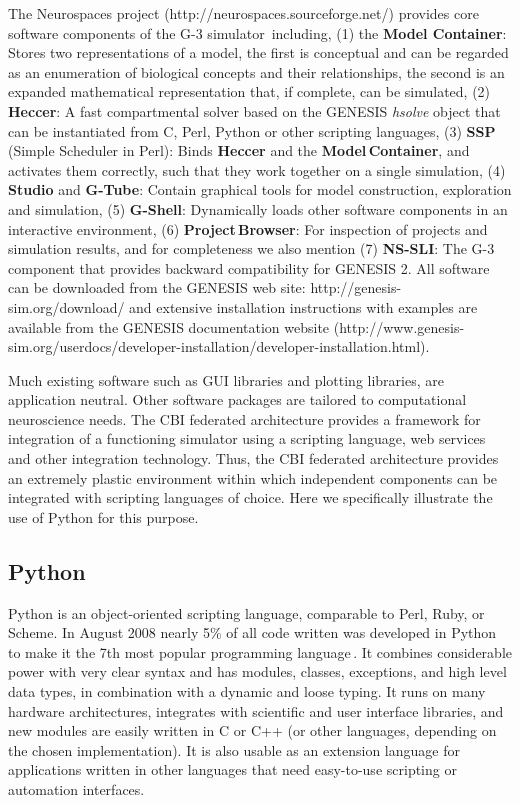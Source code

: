 \documentclass[12pt]{article}
\begin{document}
The Neurospaces project (http://neurospaces.sourceforge.net/) provides
core software components of the G-3
simulator\,\cite{cornelis03:_neuros} including, (1) the {\bf Model
  Container}: Stores two representations of a model, the first is
conceptual and can be regarded as an enumeration of biological
concepts and their relationships, the second is an expanded
mathematical representation that, if complete, can be simulated, (2)
{\bf Heccer}: A fast compartmental solver based on the GENESIS {\it
  hsolve} object that can be instantiated from C, Perl, Python or
other scripting languages, (3) {\bf SSP} (Simple Scheduler in Perl):
Binds {\bf Heccer} and the {\bf Model\,Container}, and activates them
correctly, such that they work together on a single simulation, (4)
{\bf Studio} and {\bf G-Tube}: Contain graphical tools for model
construction, exploration and simulation, (5) {\bf G-Shell}:
Dynamically loads other software components in an interactive
environment, (6) {\bf Project\,Browser}: For inspection of projects
and simulation results, and for completeness we also mention (7) {\bf
  NS-SLI}: The G-3 component that provides backward compatibility for
GENESIS 2. All software can be downloaded from the GENESIS web site:
http://genesis-sim.org/download/ and extensive installation
instructions with examples are available from the GENESIS
documentation website
(http://www.genesis-sim.org/userdocs/developer-installation/developer-installation.html).

Much existing software such as GUI libraries and plotting
libraries, are application neutral.  Other software packages are
tailored to computational neuroscience needs.  The CBI federated
architecture provides a framework for integration of a functioning
simulator using a scripting language, web services and other
integration technology.  Thus, the CBI federated architecture provides
an extremely plastic environment within which independent components can
be integrated with scripting languages of choice.  Here we
specifically illustrate the use of Python for this purpose.

\subsection{Python}

Python is an object-oriented scripting language, comparable to Perl,
Ruby, or Scheme.  In August 2008 nearly 5\% of all code written was
developed in Python to make it the 7th most popular programming
language\,\cite{software09:_tiobe_progr_commun_index}. It combines
considerable power with very clear syntax and has modules, classes,
exceptions, and high level data types, in combination with a dynamic
and loose typing. It runs on many hardware architectures, integrates
with scientific and user interface libraries, and new modules are
easily written in C or C++ (or other languages, depending on the
chosen implementation). It is also usable as an extension language for
applications written in other languages that need easy-to-use
scripting or automation interfaces.
\end{document}

